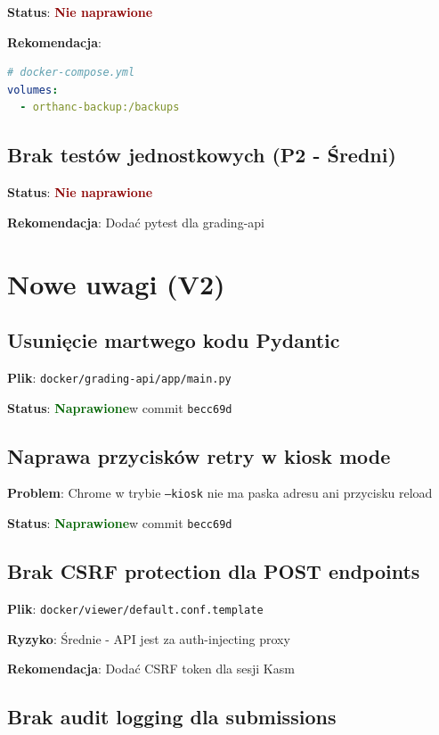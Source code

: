 \documentclass[a4paper,12pt]{article}
\newcommand{\statusok}{\textcolor{darkgreen}{\textbf{Naprawione}}}
\newcommand{\statusfail}{\textcolor{darkred}{\textbf{Nie naprawione}}}
\begin{document}
\textbf{Status}: \statusfail

\textbf{Rekomendacja}:
\begin{lstlisting}[language=YAML, caption=Backup strategy]
# docker-compose.yml
volumes:
  - orthanc-backup:/backups
\end{lstlisting}

\subsection{Brak testów jednostkowych (P2 - Średni)}

\textbf{Status}: \statusfail

\textbf{Rekomendacja}: Dodać pytest dla grading-api

\section{Nowe uwagi (V2)}

\subsection{Usunięcie martwego kodu Pydantic}

\textbf{Plik}: \texttt{docker/grading-api/app/main.py}

\textbf{Status}: \statusok w commit \texttt{becc69d}

\subsection{Naprawa przycisków retry w kiosk mode}

\textbf{Problem}: Chrome w trybie \texttt{--kiosk} nie ma paska adresu ani przycisku reload

\textbf{Status}: \statusok w commit \texttt{becc69d}

\subsection{Brak CSRF protection dla POST endpoints}

\textbf{Plik}: \texttt{docker/viewer/default.conf.template}

\textbf{Ryzyko}: Średnie - API jest za auth-injecting proxy

\textbf{Rekomendacja}: Dodać CSRF token dla sesji Kasm

\subsection{Brak audit logging dla submissions}
\end{document}
